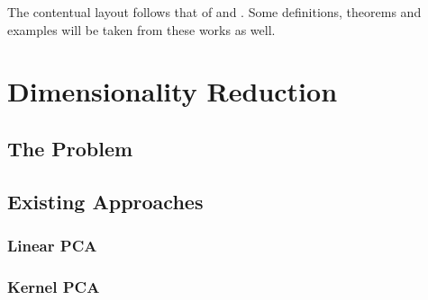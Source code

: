 The contentual layout follows that of \cite{Coifman20065} and \cite{PLM_UCTHESIS_03}. Some definitions, theorems and examples will be taken from these works as well.

\section{Dimensionality Reduction}

\subsection{The Problem}
\subsection{Existing Approaches}
\subsubsection{Linear PCA}
\subsubsection{Kernel PCA}
